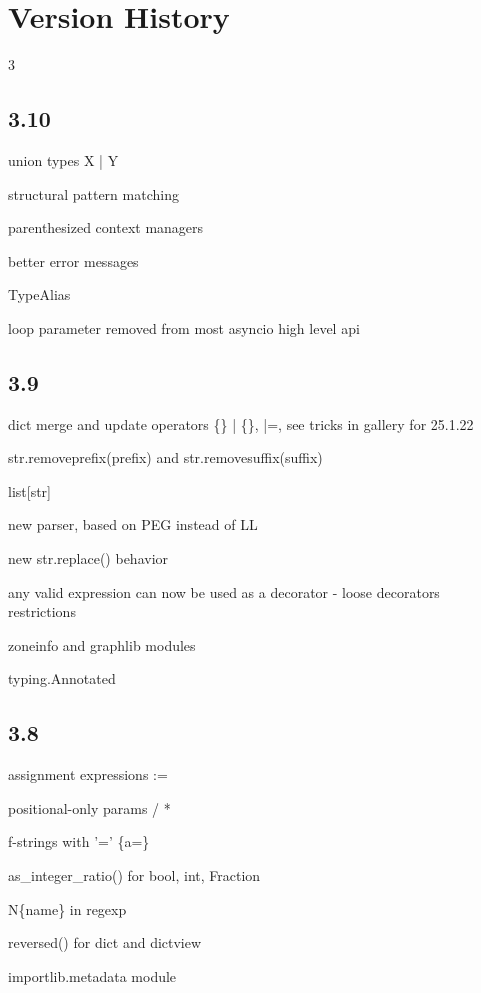 \documentclass [8pt] {extarticle}
\begin{document}
    \section {Version History}

    \begin {multicols} {3}

    \subsection {3.10}

    union types X | Y

    structural pattern matching

    parenthesized context managers

    better error messages

    TypeAlias

    loop parameter removed from most asyncio high level api

    \subsection {3.9}

    dict merge and update operators \{\} | \{\}, |=, see tricks in gallery for 25.1.22

    str.removeprefix(prefix) and str.removesuffix(suffix)

    list[str]

    new parser, based on PEG instead of LL

    new str.replace() behavior

    any valid expression can now be used as a decorator - loose decorators restrictions

    zoneinfo and graphlib modules

    typing.Annotated

    \subsection {3.8}

    assignment expressions :=

    positional-only params / *

    f-strings with '=' \{a=\}

    as\_integer\_ratio() for bool, int, Fraction

    N\{name\} in regexp

    reversed() for dict and dictview

    importlib.metadata module


\end{multicols}
\end{document}

